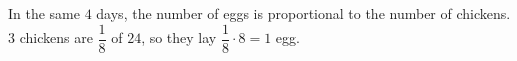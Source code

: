 In the same $4$ days, the number of eggs is proportional to the number of chickens. $3$ chickens are $\dfrac{1}{8}$ of $24$, so they lay $\dfrac{1}{8}\cdot8=\boxed{1}$ egg.
